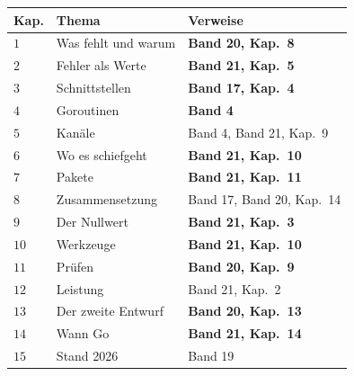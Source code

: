 \begin{merksatz}
\begin{center}
{\small
\renewcommand{\arraystretch}{1.45}
\begin{tabular}{@{}P{1.0cm}P{3.6cm}P{4.2cm}@{}}
\toprule
\textbf{Kap.} & \textbf{Thema} & \textbf{Verweise}\\
\midrule
$1$ & Was fehlt und warum & \textbf{Band 20, Kap.~8}\\
$2$ & Fehler als Werte & \textbf{Band 21, Kap.~5}\\
$3$ & Schnittstellen & \textbf{Band 17, Kap.~4}\\
$4$ & Goroutinen & \textbf{Band 4}\\
$5$ & Kanäle & Band 4, Band 21, Kap.~9\\
$6$ & Wo es schiefgeht & \textbf{Band 21, Kap.~10}\\
$7$ & Pakete & \textbf{Band 21, Kap.~11}\\
$8$ & Zusammensetzung & Band 17, Band 20, Kap.~14\\
$9$ & Der Nullwert & \textbf{Band 21, Kap.~3}\\
$10$ & Werkzeuge & \textbf{Band 21, Kap.~10}\\
$11$ & Prüfen & \textbf{Band 20, Kap.~9}\\
$12$ & Leistung & Band 21, Kap.~2\\
$13$ & Der zweite Entwurf & \textbf{Band 20, Kap.~13}\\
$14$ & Wann Go & \textbf{Band 21, Kap.~14}\\
$15$ & Stand 2026 & Band 19\\
\bottomrule
\end{tabular}}
\end{center}
\end{merksatz}

